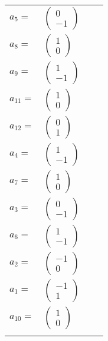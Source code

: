 \documentclass[1p]{elsarticle_modified}
\theoremstyle{definition}
\begin{document}
\begin{tabular}{m{7pt} m{180pt} m{7pt} m{180pt} }
\flushright $a_{5}=$&$\begin{pmatrix}0\\-1\end{pmatrix}$ \\
\flushright $a_{8}=$&$\begin{pmatrix}1\\0\end{pmatrix}$ \\
\flushright $a_{9}=$&$\begin{pmatrix}1\\-1\end{pmatrix}$ \\
\flushright $a_{11}=$&$\begin{pmatrix}1\\0\end{pmatrix}$ \\
\flushright $a_{12}=$&$\begin{pmatrix}0\\1\end{pmatrix}$ \\
\flushright $a_{4}=$&$\begin{pmatrix}1\\-1\end{pmatrix}$ \\
\flushright $a_{7}=$&$\begin{pmatrix}1\\0\end{pmatrix}$ \\
\flushright $a_{3}=$&$\begin{pmatrix}0\\-1\end{pmatrix}$ \\
\flushright $a_{6}=$&$\begin{pmatrix}1\\-1\end{pmatrix}$ \\
\flushright $a_{2}=$&$\begin{pmatrix}-1\\0\end{pmatrix}$ \\
\flushright $a_{1}=$&$\begin{pmatrix}-1\\1\end{pmatrix}$ \\
\flushright $a_{10}=$&$\begin{pmatrix}1\\0\end{pmatrix}$\\&\end{tabular}
\end{document}

